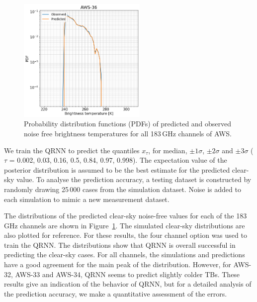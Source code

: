 \documentclass[12pt]{article}
\begin{document}
\begin{figure}[!p]
	\includegraphics[height=60mm]{distribution_predicted_C36}
	\caption{ Probability distribution functions (PDFs) of predicted and observed noise free brightness temperatures for all 183\,GHz channels of AWS.  }
	\label{fig:pdf:qrnn}
\end{figure}
We train the QRNN to predict the quantiles $x_{\tau}$, for median, $\pm 1\sigma$, $\pm 2 \sigma$ and  $\pm 3 \sigma$ ($\tau$ = 0.002, 0.03, 0.16, 0.5, 0.84, 0.97, 0.998). The expectation value of the posterior distribution is assumed to be the best estimate for the predicted clear-sky value. To analyse the prediction accuracy, a testing dataset is constructed by randomly drawing 25\,000 cases from the simulation dataset. Noise is added to each simulation to mimic a new measurement dataset. 

The distributions of the predicted clear-sky noise-free values for each of the 183\, GHz channels are shown in Figure~\ref{fig:pdf:qrnn}. The simulated clear-sky distributions are also plotted for reference. For these results, the four channel option was used to train the QRNN. The distributions show that QRNN is overall successful in predicting the clear-sky cases. For all channels, the simulations and predictions have a good agreement for the main peak of the distribution. However, for AWS-32, AWS-33 and  AWS-34, QRNN seems to predict slightly colder TBs. These results give an indication of the behavior of QRNN, but for a detailed analysis of the prediction accuracy, we make a quantitative assessment of the errors. 
\end{document}
